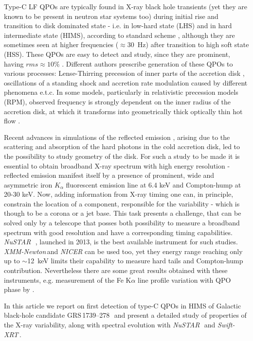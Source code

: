 \documentclass[a4paper,fleqn,usenatbib]{mnras}
\def\grs{{GRS\,1739--278\,}}
\def\swiftx{{\em Swift-XRT\,}}
\def\xmm{{\em XMM-Newton\,}}
\def\nustar{{\em NuSTAR\,}}
\begin{document}
Type-C LF QPOs are typically found in X-ray black hole transients (yet they are known to be present in neutron star systems too) during initial rise and transition to disk dominated state - i.e. in low-hard state (LHS) and in hard intermediate state (HIMS), according to standard scheme \citep{grebenev97, tanaka96, remillard06, belloni10}, although they are sometimes seen at higher frequencies ($\approx$30~Hz) after transition to high soft state (HSS). These QPOs are easy to detect and study, since they are prominent, having $rms\approx10\%$ \citep{casella05}. 
Different authors prescribe generation of these QPOs to various processes: Lense-Thirring precession of inner parts of the accretion disk \citep{stella98, ingram09}, oscillations of a standing shock \citep{molteni96} and accretion rate modulation caused by different phenomena \citep{tagger99,cabanac10} e.t.c. 
In some models, particularly in relativistic precession models (RPM), observed frequency is strongly dependent on the inner radius of the accretion disk, at which it transforms into geometrically thick optically thin hot flow . 

Recent advances in simulations of the reflected emission \citep{ross05,garcia14}, arising due to the scattering and absorption of the hard photons in the cold accretion disk, led to the possibility to study geometry of the disk.  
For such a study to be made it is essential to obtain broadband X-ray spectrum with high energy resolution - reflected emission manifest itself by a presence of prominent, wide and asymmetric iron $K_{\alpha}$ fluorescent emission line at 6.4 keV and Compton-hump at 20-30 keV. 
Now, adding information from X-ray timing one can, in principle, constrain the location of a component, responsible for the variability - which is though to be a corona or a jet base.
This task presents a challenge, that can be solved only by a telescope that posses both possibility to measure a broadband spectrum with good resolution and have a corresponding timing capabilities. 
\nustar\, \citep{harrison13_nust}, launched in 2013, is the best available instrument for such studies. 
\xmm and {\it NICER} can be used too, yet they energy range reaching only up to $\sim$12~keV limits their capability to measure hard tails and Compton-hump contribution.
Nevertheless there are some great results obtained with these instruments, e.g. measurement of the Fe K$\alpha$ line profile variation with QPO phase by \citet[][]{ingram16}. 

In this article we report on first detection of type-C QPOs in HIMS of Galactic black-hole candidate \grs\, and present a detailed study of properties of the X-ray variability, along with spectral evolution with \nustar\ and \swiftx.
\end{document}

